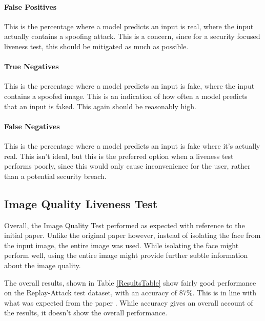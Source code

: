 \documentclass[10pt,a4paper]{article}
\begin{document}
            \paragraph{False Positives}
                This is the percentage where a model predicts an input is real, where the input actually contains a spoofing attack. This is a concern, since for a security focused
                liveness test, this should be mitigated as much as possible.

            \paragraph{True Negatives}
                This is the percentage where a model predicts an input is fake, where the input contains a spoofed image. This is an indication of how often a model predicts that an input is faked.
                This again should be reasonably high.

            \paragraph{False Negatives}
                This is the percentage where a model predicts an input is fake where it's actually real. This isn't ideal, but this is the preferred option when a liveness test performs poorly, since
                this would only cause inconvenience for the user, rather than a potential security breach.
            
   
    \subsection{Image Quality Liveness Test}
        Overall, the Image Quality Test performed as expected with reference to the initial paper. Unlike the original paper however, instead of isolating the face
        from the input image, the entire image was used. While isolating the face might perform well, using the entire image might provide further subtle information
        about the image quality.

        The overall results, shown in Table \ref{ResultsTable} show fairly good performance on the Replay-Attack test dataset, with an accuracy of 87\%. This is in line with
        what was expected from the paper \cite{ImageQualityAssessmentTest}. While accuracy gives an overall account of the results, it doesn't show the overall performance.
        
\end{document}
